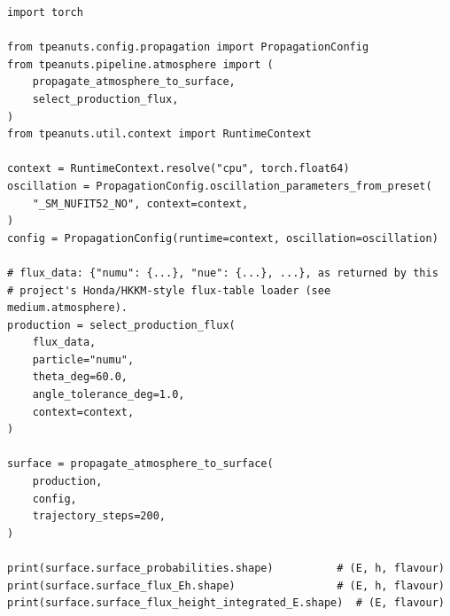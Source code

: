\begin{examplebox}[title={Muon-neutrino production at 60\textdegree{} zenith, propagated to the surface}]
\begin{lstlisting}[style=tpython]
import torch

from tpeanuts.config.propagation import PropagationConfig
from tpeanuts.pipeline.atmosphere import (
    propagate_atmosphere_to_surface,
    select_production_flux,
)
from tpeanuts.util.context import RuntimeContext

context = RuntimeContext.resolve("cpu", torch.float64)
oscillation = PropagationConfig.oscillation_parameters_from_preset(
    "_SM_NUFIT52_NO", context=context,
)
config = PropagationConfig(runtime=context, oscillation=oscillation)

# flux_data: {"numu": {...}, "nue": {...}, ...}, as returned by this
# project's Honda/HKKM-style flux-table loader (see medium.atmosphere).
production = select_production_flux(
    flux_data,
    particle="numu",
    theta_deg=60.0,
    angle_tolerance_deg=1.0,
    context=context,
)

surface = propagate_atmosphere_to_surface(
    production,
    config,
    trajectory_steps=200,
)

print(surface.surface_probabilities.shape)          # (E, h, flavour)
print(surface.surface_flux_Eh.shape)                # (E, h, flavour)
print(surface.surface_flux_height_integrated_E.shape)  # (E, flavour)
\end{lstlisting}
\end{examplebox}
